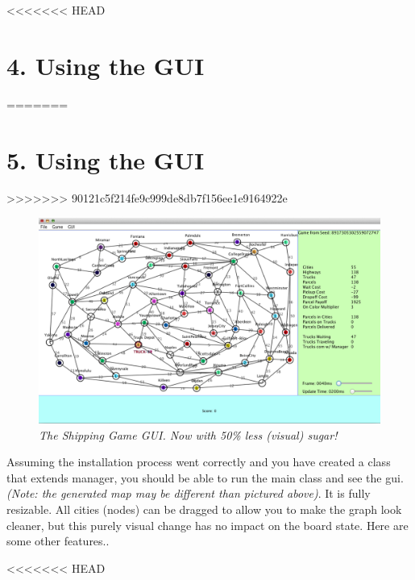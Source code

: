 \documentclass[11pt]{article}
\begin{document}
<<<<<<< HEAD
\section{4. Using the GUI}
=======
\section{5. Using the GUI}
>>>>>>> 90121c5f214fe9c999de8db7f156ee1e9164922e
\begin{figure}[h]
\centerline{\includegraphics[scale=0.45]{gui.png}} 
\caption{\em{The Shipping Game GUI. Now with 50\% less (visual) sugar!}}
\end{figure}

Assuming the installation process went correctly and you have created a class that extends manager, you should be able to run the main class and see the gui. {\em(Note: the generated map may be different than pictured above)}. It is fully resizable. All cities (nodes) can be dragged to allow you to make the graph look cleaner, but  this purely visual change has no impact on the board state. Here are some other features.. 

<<<<<<< HEAD
\end{document}
